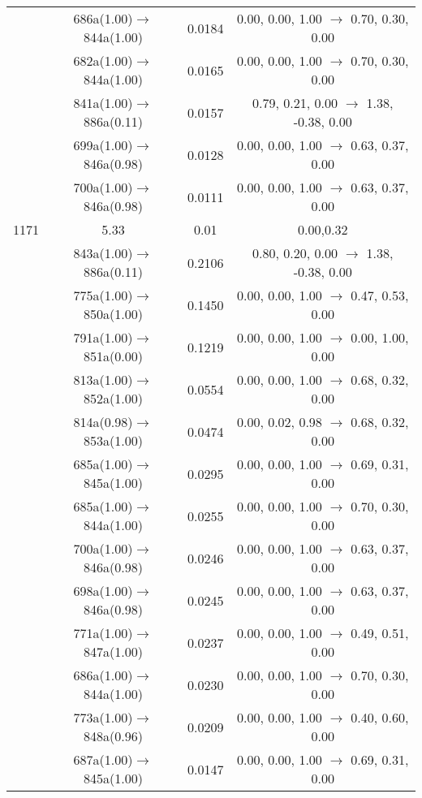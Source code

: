 \documentclass[10pt,a4paper]{article}
\begin{document}
\begin{longtable}{c|c|c|c}
 	& 686a(1.00)$\rightarrow$844a(1.00) &	 0.0184 &	 0.00, 0.00, 1.00 $\rightarrow$ 0.70, 0.30, 0.00 \\ 
 	& 682a(1.00)$\rightarrow$844a(1.00) &	 0.0165 &	 0.00, 0.00, 1.00 $\rightarrow$ 0.70, 0.30, 0.00 \\ 
 	& 841a(1.00)$\rightarrow$886a(0.11) &	 0.0157 &	 0.79, 0.21, 0.00 $\rightarrow$ 1.38, -0.38, 0.00 \\ 
 	& 699a(1.00)$\rightarrow$846a(0.98) &	 0.0128 &	 0.00, 0.00, 1.00 $\rightarrow$ 0.63, 0.37, 0.00 \\ 
 	& 700a(1.00)$\rightarrow$846a(0.98) &	 0.0111 &	 0.00, 0.00, 1.00 $\rightarrow$ 0.63, 0.37, 0.00 \\ 
 \hline1171 &	 5.33 &	 0.01 &	 0.00,0.32 \\ 
  	& 843a(1.00)$\rightarrow$886a(0.11) &	 0.2106 &	 0.80, 0.20, 0.00 $\rightarrow$ 1.38, -0.38, 0.00 \\ 
 	& 775a(1.00)$\rightarrow$850a(1.00) &	 0.1450 &	 0.00, 0.00, 1.00 $\rightarrow$ 0.47, 0.53, 0.00 \\ 
 	& 791a(1.00)$\rightarrow$851a(0.00) &	 0.1219 &	 0.00, 0.00, 1.00 $\rightarrow$ 0.00, 1.00, 0.00 \\ 
 	& 813a(1.00)$\rightarrow$852a(1.00) &	 0.0554 &	 0.00, 0.00, 1.00 $\rightarrow$ 0.68, 0.32, 0.00 \\ 
 	& 814a(0.98)$\rightarrow$853a(1.00) &	 0.0474 &	 0.00, 0.02, 0.98 $\rightarrow$ 0.68, 0.32, 0.00 \\ 
 	& 685a(1.00)$\rightarrow$845a(1.00) &	 0.0295 &	 0.00, 0.00, 1.00 $\rightarrow$ 0.69, 0.31, 0.00 \\ 
 	& 685a(1.00)$\rightarrow$844a(1.00) &	 0.0255 &	 0.00, 0.00, 1.00 $\rightarrow$ 0.70, 0.30, 0.00 \\ 
 	& 700a(1.00)$\rightarrow$846a(0.98) &	 0.0246 &	 0.00, 0.00, 1.00 $\rightarrow$ 0.63, 0.37, 0.00 \\ 
 	& 698a(1.00)$\rightarrow$846a(0.98) &	 0.0245 &	 0.00, 0.00, 1.00 $\rightarrow$ 0.63, 0.37, 0.00 \\ 
 	& 771a(1.00)$\rightarrow$847a(1.00) &	 0.0237 &	 0.00, 0.00, 1.00 $\rightarrow$ 0.49, 0.51, 0.00 \\ 
 	& 686a(1.00)$\rightarrow$844a(1.00) &	 0.0230 &	 0.00, 0.00, 1.00 $\rightarrow$ 0.70, 0.30, 0.00 \\ 
 	& 773a(1.00)$\rightarrow$848a(0.96) &	 0.0209 &	 0.00, 0.00, 1.00 $\rightarrow$ 0.40, 0.60, 0.00 \\ 
 	& 687a(1.00)$\rightarrow$845a(1.00) &	 0.0147 &	 0.00, 0.00, 1.00 $\rightarrow$ 0.69, 0.31, 0.00 \\ 

\end{longtable}
\end{document}
